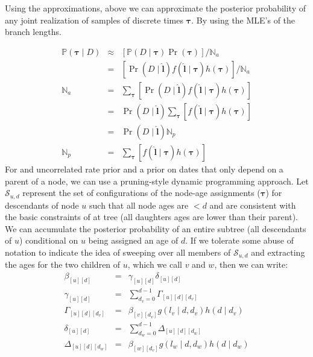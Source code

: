 \documentclass{llncs}
\newcommand{\dataMatrix}[0]{\ensuremath{D}\xspace}
\newcommand{\edgeLen}[1]{\ensuremath{l_{#1}}\xspace}
\newcommand{\edgeLenVec}[0]{\ensuremath{\bm{l}}\xspace}
\newcommand{\timeBinRealizationVec}[0]{\ensuremath{\bm{\tau}}\xspace}
\newcommand{\subtreeAgeSum}[2]{\ensuremath{\beta_{[{#1}][{#2}]}}\xspace}
\newcommand{\leftThreeDTable}[3]{\ensuremath{\Gamma_{[{#1}][{#2}][{#3}]}}\xspace}
\newcommand{\rightThreeDTable}[3]{\ensuremath{\Delta_{[{#1}][{#2}][{#3}]}}\xspace}
\newcommand{\leftSubtreeAgeSum}[2]{\ensuremath{\gamma_{[{#1}][{#2}]}}\xspace}
\newcommand{\rightSubtreeAgeSum}[2]{\ensuremath{\delta_{[{#1}][{#2}]}}\xspace}
\newcommand{\ratePriorDensity}[0]{\ensuremath{g}\xspace}
\newcommand{\timePriorDensity}[0]{\ensuremath{h}\xspace}
\newcommand{\ImpPr}[0]{\ensuremath{\mathbb{P}}\xspace}
\newcommand{\norm}[0]{\ensuremath{\mathbb{N}}\xspace}
\newcommand{\subtreeConst}[2]{\mathcal{S}_{#1,#2}}
\begin{document}
Using the approximations, above we can approximate the posterior probability of any
    joint realization of samples of discrete times $\timeBinRealizationVec$.
By using the MLE's of the branch lengths.

\begin{eqnarray}
    \ImpPr(\timeBinRealizationVec \mid \dataMatrix) & \approx &\left[\ImpPr(D\mid \timeBinRealizationVec)\Pr(\timeBinRealizationVec) \right]/\norm_a\\
    & = & \left[\Pr(D \mid \hat{\edgeLenVec})f(\hat{\edgeLenVec} \mid \timeBinRealizationVec)\timePriorDensity(\timeBinRealizationVec) \right]/\norm_a\\
    \norm_a & = & \sum_{\timeBinRealizationVec} \left[\Pr(D \mid \hat{\edgeLenVec})f(\hat{\edgeLenVec} \mid \timeBinRealizationVec)\timePriorDensity(\timeBinRealizationVec)\right] \\
    & = & \Pr(D \mid \hat{\edgeLenVec})\sum_{\timeBinRealizationVec} \left[f(\hat{\edgeLenVec} \mid \timeBinRealizationVec)\timePriorDensity(\timeBinRealizationVec)\right] \\
        & = & \Pr(D \mid \hat{\edgeLenVec})\norm_p \\
    \norm_p & = & \sum_{\timeBinRealizationVec} \left[f(\hat{\edgeLenVec} \mid \timeBinRealizationVec)\timePriorDensity(\timeBinRealizationVec)\right]
\end{eqnarray}
For and uncorrelated rate prior and a prior on dates that only depend on a parent of a node, we can
    use a pruning-style dynamic programming approach.
Let $\subtreeConst{u}{d}$ represent the set of configurations of the node-age assignments ($\timeBinRealizationVec$)
    for descendants of node $u$ such that all node ages are $<d$ and are consistent
    with the basic constraints of at tree (all daughters ages are lower than their parent).
We can accumulate the posterior probability of an entire subtree (all descendants of $u$)
    conditional on $u$ being assigned an age of $d$.
If we tolerate some abuse of notation to indicate the idea of 
    sweeping over all members of $\subtreeConst{u}{d}$ and extracting the
    ages for the two children of $u$, which we call $v$ and $w$, then
    we can write:
\begin{eqnarray}
\subtreeAgeSum{u}{d} & = & \leftSubtreeAgeSum{u}{d} \rightSubtreeAgeSum{u}{d} \\
\leftSubtreeAgeSum{u}{d} & = & \sum_{d_v = 0}^{d-1} \leftThreeDTable{u}{d}{d_v} \\
\leftThreeDTable{u}{d}{d_v} & = & \subtreeAgeSum{v}{d_v} \ratePriorDensity(\edgeLen{v} \mid d, d_v) \timePriorDensity(d\mid d_v) \\
\rightSubtreeAgeSum{u}{d} & = & \sum_{d_w = 0}^{d-1} \rightThreeDTable{u}{d}{d_w} \\
\rightThreeDTable{u}{d}{d_w} & = & \subtreeAgeSum{w}{d_v} \ratePriorDensity(\edgeLen{w} \mid d, d_w) \timePriorDensity(d\mid d_w)
\end{eqnarray}
\end{document}
